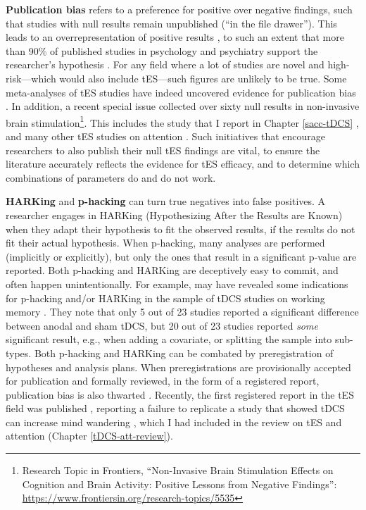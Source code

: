 \documentclass[11pt,english,]{memoir}
\let\rmarkdownfootnote\footnote%
\def\footnote{\protect\rmarkdownfootnote}
\begin{document}
\textbf{Publication bias} \autocite{Rosenthal1979} refers to a preference for positive over negative findings, such that studies with null results remain unpublished (``in the file drawer''). This leads to an overrepresentation of positive results \autocite{Franco2014}, to such an extent that more than 90\% of published studies in psychology and psychiatry support the researcher's hypothesis \autocite{Fanelli2012}. For any field where a lot of studies are novel and high-risk---which would also include tES---such figures are unlikely to be true. Some meta-analyses of tES studies have indeed uncovered evidence for publication bias \autocite{Mancuso2016}. In addition, a recent special issue collected over sixty null results in non-invasive brain stimulation\footnote{Research Topic in Frontiers, ``Non-Invasive Brain Stimulation Effects on Cognition and Brain Activity: Positive Lessons from Negative Findings'': \url{https://www.frontiersin.org/research-topics/5535}}. This includes the study that I report in Chapter \ref{sacc-tDCS} \autocite{Reteig2018b}, and many other tES studies on attention \autocites{Jacoby2018}{Learmonth2017}{Lanina2018}{VanSchouwenburg2018}{Sheldon2018}{Tseng2018}{Veniero2017}. Such initiatives that encourage researchers to also publish their null tES findings are vital, to ensure the literature accurately reflects the evidence for tES efficacy, and to determine which combinations of parameters do and do not work.

\textbf{HARKing} \autocite{Kerr1998} and \textbf{p-hacking} \autocites{Simmons2011}{Simonsohn2014} can turn true negatives into false positives. A researcher engages in HARKing (Hypothesizing After the Results are Known) when they adapt their hypothesis to fit the observed results, if the results do not fit their actual hypothesis. When p-hacking, many analyses are performed (implicitly or explicitly), but only the ones that result in a significant p-value are reported. Both p-hacking and HARKing are deceptively easy to commit, and often happen unintentionally. For example, \textcite{Medina2017} may have revealed some indications for p-hacking and/or HARKing in the sample of tDCS studies on working memory \autocite{Mancuso2016}. They note that only 5 out of 23 studies reported a significant difference between anodal and sham tDCS, but 20 out of 23 studies reported \emph{some} significant result, e.g., when adding a covariate, or splitting the sample into sub-types. Both p-hacking and HARKing can be combated by preregistration \autocite{Nosek2018} of hypotheses and analysis plans. When preregistrations are provisionally accepted for publication and formally reviewed, in the form of a registered report, publication bias is also thwarted \autocite{Chambers2014}. Recently, the first registered report in the tES field was published \autocite{Boayue2019}, reporting a failure to replicate a study that showed tDCS can increase mind wandering \autocite{Axelrod2015}, which I had included in the review on tES and attention (Chapter \ref{tDCS-att-review}).
\end{document}
